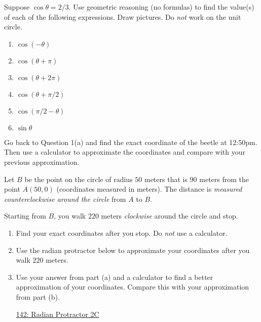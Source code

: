 \documentclass{ximera}
\begin{document}
\begin{question} \label{Q9df3rFDD}
Suppose $\cos\theta =2/3$. Use geometric reasoning (no formulas) to find the value(s) of each of the following expressions. Draw pictures. Do \emph{not} work on the unit circle.

\begin{enumerate}
\item $\cos(-\theta)$

\item $\cos(\theta+\pi)$

\item $\cos(\theta+2\pi)$

\item $\cos(\theta+\pi/2)$

\item  $\cos(\pi/2 - \theta)$

\item $\sin\theta$


\end{enumerate}
\end{question}

\begin{question} \label{Q99f3332}
Go back to Question 1(a) and find the exact coordinate of the beetle at 12:50pm. Then use a calculator to approximate the coordinates and compare with your previous approximation.
\end{question}






\begin{example}  \label{Exp89dsfrer94444}

Let $B$ be the point on the circle of radius $50$ meters that is $90$ meters from the point $A(50,0)$  (coordinates measured in meters). The distance is \emph{measured counterclockwise around the circle} from $A$ to $B$. 

Starting from $B$, you walk  $220$ meters \emph{clockwise} around the circle and stop.

\begin{enumerate}

\item Find your exact coordinates after you stop. Do \emph{not} use a calculator.

\item Use the radian protractor below to approximate your coordinates after you walk $220$ meters.
 
\item Use your answer from part (a) and a calculator to find a better approximation of your coordinates. Compare this with your approximation from part (b).

\begin{onlineOnly}
    \begin{center}
\end{center}
\end{onlineOnly}

\href{https://www.desmos.com/calculator/lbkveixdno}{142: Radian Protractor 2C}

\end{enumerate}

\end{example}
\end{document}
